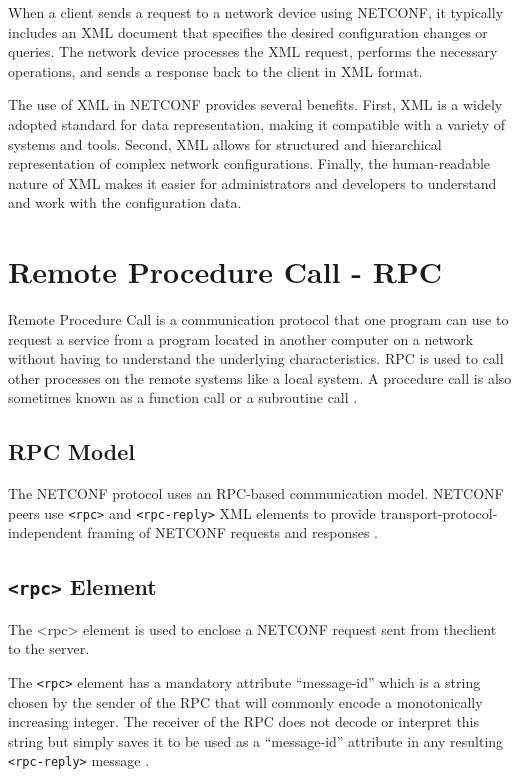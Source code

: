 When a client sends a request to a network device using NETCONF, it typically includes an XML document that specifies the desired configuration changes or queries. The network device processes the XML request, performs the necessary operations, and sends a response back to the client in XML format.

The use of XML in NETCONF provides several benefits. First, XML is a widely adopted standard for data representation, making it compatible with a variety of systems and tools. Second, XML allows for structured and hierarchical representation of complex network configurations. Finally, the human-readable nature of XML makes it easier for administrators and developers to understand and work with the configuration data.


\section{Remote Procedure Call - RPC}
Remote Procedure Call is a communication protocol that one program can use to request a service from a program located in another computer on a network without having to understand the underlying characteristics. RPC is used to call other processes on the remote systems like a local system. A procedure call is also sometimes known as a function call or a subroutine call \cite{techrpc}.

\subsection{RPC Model}

The NETCONF protocol uses an RPC-based communication model. NETCONF peers use \texttt{<rpc>} and \texttt{<rpc-reply>} XML elements to provide transport-protocol-independent framing of NETCONF requests and responses \cite{RFC6241N71}.

\subsection{\texttt{<rpc>} Element}
The \textless{rpc}\textgreater{} element is used to enclose a NETCONF request sent from theclient to the server.

The \texttt{<rpc>} element has a mandatory attribute ``message-id'' which is a string chosen by the sender of the RPC that will commonly encode a monotonically increasing integer. The receiver of the RPC does not decode or interpret this string but simply saves it to be used as a ``message-id'' attribute in any resulting \texttt{<rpc-reply>} message \cite{RFC6241N8}. 

